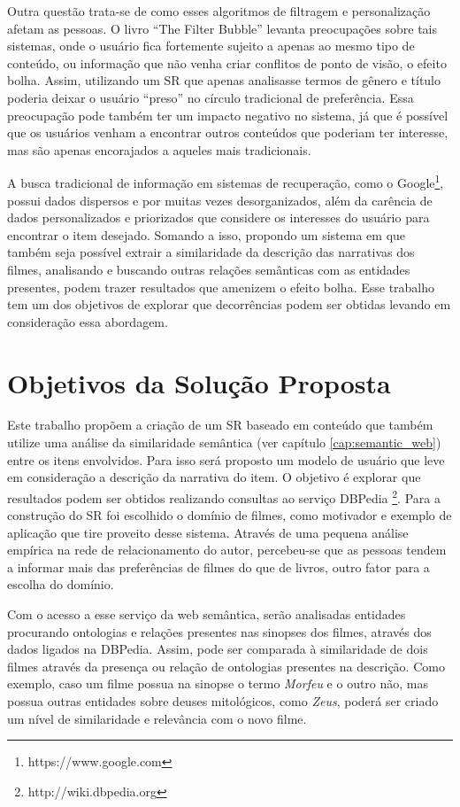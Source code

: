 Outra questão trata-se de como esses algoritmos de filtragem e personalização afetam as pessoas. O livro “The Filter Bubble” \cite{Pariser:2011} levanta preocupações sobre tais sistemas, onde o usuário fica fortemente sujeito a apenas ao mesmo tipo de conteúdo, ou informação que não venha criar conflitos de ponto de visão, o efeito bolha. Assim, utilizando um SR que apenas analisasse termos de gênero e título poderia deixar o usuário “preso” no círculo tradicional de preferência. Essa preocupação pode também ter um impacto negativo no sistema, já que é possível que os usuários venham a encontrar outros conteúdos que poderiam ter interesse, mas são apenas encorajados a aqueles mais tradicionais. 

A busca tradicional de informação em sistemas de recuperação, como o Google\footnote{https://www.google.com}, possui dados dispersos e por muitas vezes desorganizados, além da carência de dados personalizados e priorizados que considere os interesses do usuário para encontrar o item desejado. Somando a isso, propondo um sistema em que também seja possível extrair a similaridade da descrição das narrativas dos filmes, analisando e buscando outras relações semânticas com as entidades presentes, podem trazer resultados que amenizem o efeito bolha. Esse trabalho tem um dos objetivos de explorar que decorrências podem ser obtidas levando em consideração essa abordagem.

\section{Objetivos da Solução Proposta}

Este trabalho propõem a criação de um SR baseado em conteúdo que também utilize uma análise da similaridade semântica (ver capítulo \ref{cap:semantic_web}) entre os itens envolvidos. Para isso será proposto um modelo de usuário que leve em consideração a descrição da narrativa do item. O objetivo é explorar que resultados podem ser obtidos realizando consultas ao serviço DBPedia \footnote{http://wiki.dbpedia.org}. Para a construção do SR foi escolhido o domínio de filmes, como motivador e exemplo de aplicação que tire proveito desse sistema. Através de uma pequena análise empírica na rede de relacionamento do autor, percebeu-se que as pessoas tendem a informar mais das preferências de filmes do que de livros, outro fator para a escolha do domínio.

Com o acesso a esse serviço da web semântica, serão analisadas entidades procurando ontologias e relações presentes nas sinopses dos filmes, através dos dados ligados na DBPedia. Assim, pode ser comparada à similaridade de dois filmes através da presença ou relação de ontologias presentes na descrição. Como exemplo, caso um filme possua na sinopse o termo \textit{Morfeu} e o outro não, mas possua outras entidades sobre deuses mitológicos, como \textit{Zeus}, poderá ser criado um nível de similaridade e relevância com o novo filme.

